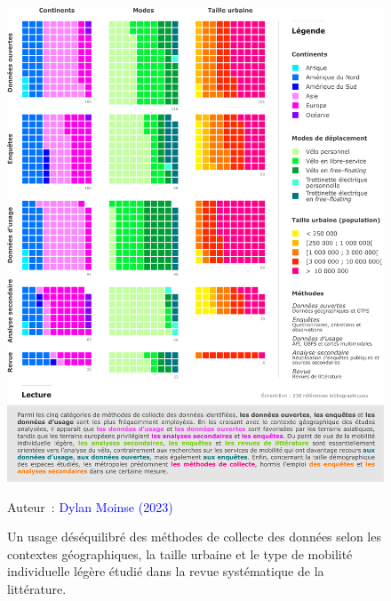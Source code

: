 \begin{refsegment}
    \begin{figure}[h!]\vspace*{4pt}
        \caption{Un usage déséquilibré des méthodes de collecte des données selon les contextes géographiques, la taille urbaine et le type de mobilité individuelle légère étudié dans la revue systématique de la littérature.}
        \label{fig-chap2:sources-donnees-rsl}
        \centerline{\includegraphics[width=1\columnwidth]{src/Figures/Chap-2/FR_RSL_Sources_donnees.pdf}}
        \vspace{5pt}
        \begin{flushright}\scriptsize{
        Auteur~: \textcolor{blue}{Dylan Moinse (2023)}
        }\end{flushright}
    \end{figure}


\end{refsegment}
